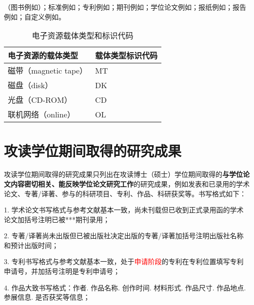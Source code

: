 （图书例如\cite{杨新文2017轨道交通轮轨噪声机理预测与控制,教育部国家语言文字工作委员会2018通用规范汉字表,霍夫斯基主编1981禽病学,王夫之1865宋论,白书农1998植物开花研究,Itkis1976control}）；标准例如\cite{全国信息与文献标准化技术委员会2007学位论文编写规}；专利例如\cite{姜锡洲1983一种温热外敷药制备方案,王士民2023一种用于研究盾构隧道管片上浮形态的模型实验装置}；期刊例如\cite{高晗2020深度学习模型压缩与加速综述,zeng2019spectrum,rathgeb2023extended}；学位论文例如\cite{陈梦玉2021基于人工智能算法的无线网络认知通信信号波形技术研究}；报纸例如\cite{仲音2023敢做善为抓落实}；报告例如\cite{冯西桥1997核反应堆压力容器的LBB分析}；自定义例如\cite{萧钰2001出版业信息化驶入快车道}。

\begin{table}[!ht]
\centering
\caption{电子资源载体类型和标识代码}
\label{tab2-5}
\belowrulesep=0pt
\aboverulesep=0pt
\begin{tabularx}{\textwidth}{ 
>{\centering\arraybackslash}X|
>{\centering\arraybackslash}X
}
\toprule
电子资源的载体类型 & 载体类型标识代码 \\
\midrule
磁带（magnetic tape） & MT \\
磁盘（disk） & DK \\
光盘（CD-ROM） & CD \\
联机网络（online） & OL \\
\bottomrule
\end{tabularx}
\end{table}

\section{攻读学位期间取得的研究成果}\label{sec2.10}

攻读学位期间取得的研究成果只列出在攻读博士（硕士）学位期间取得的\textbf{与学位论文内容密切相关、能反映学位论文研究工作}的研究成果，例如发表和已录用的学术论文、专著/译著、参与的科研项目、专利、作品、科研获奖等。书写格式如下：

1. 学术论文书写格式与参考文献基本一致，尚未刊载但已收到正式录用函的学术论文加括号注明已被***期刊录用；

2. 专著/译著尚未出版但已被出版社决定出版的专著/译著加括号注明出版社名称和预计出版时间；

3. 专利书写格式与参考文献基本一致，处于\textcolor{red}{申请阶段}的专利在专利位置填写专利申请号，并加括号注明是专利申请号；

4. 作品大致书写格式：作者. 作品名称. 创作时间. 材料形式. 作品尺寸. 作品地点. 参展信息. 是否获奖等信息；

